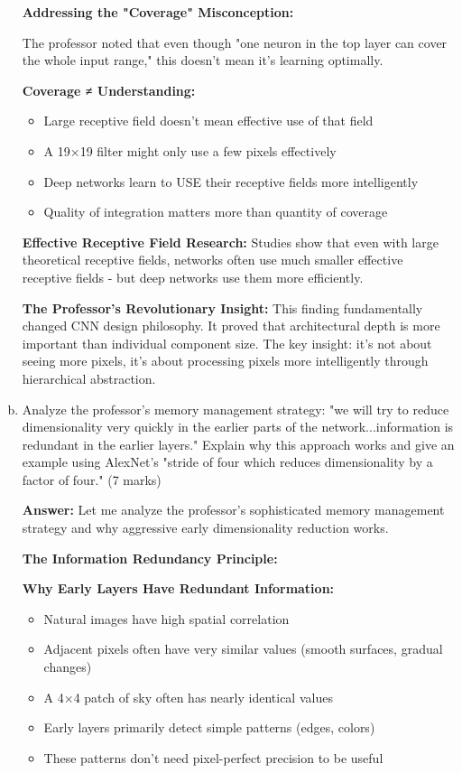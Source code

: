 \documentclass[12pt]{article}
\newcommand{\answer}[1]{{\color{answercolor}\textbf{Answer:} #1}}
\newcommand{\explanation}[1]{{\color{explanationcolor}#1}}
\begin{document}
\begin{enumerate}[(a)]
{    \textbf{Addressing the "Coverage" Misconception:}
    
    \explanation{
    The professor noted that even though "one neuron in the top layer can cover the whole input range," this doesn't mean it's learning optimally.
    
    \textbf{Coverage ≠ Understanding:}
    \begin{itemize}
        \item Large receptive field doesn't mean effective use of that field
        \item A 19×19 filter might only use a few pixels effectively
        \item Deep networks learn to USE their receptive fields more intelligently
        \item Quality of integration matters more than quantity of coverage
    \end{itemize}
    
    \textbf{Effective Receptive Field Research:}
    Studies show that even with large theoretical receptive fields, networks often use much smaller effective receptive fields - but deep networks use them more efficiently.
    }
    
    \textbf{The Professor's Revolutionary Insight:}
    \explanation{
    This finding fundamentally changed CNN design philosophy. It proved that architectural depth is more important than individual component size. The key insight: it's not about seeing more pixels, it's about processing pixels more intelligently through hierarchical abstraction.
    }
    }
    
    \item Analyze the professor's memory management strategy: "we will try to reduce dimensionality very quickly in the earlier parts of the network...information is redundant in the earlier layers." Explain why this approach works and give an example using AlexNet's "stride of four which reduces dimensionality by a factor of four." \hfill (7 marks)
    
    \answer{
    Let me analyze the professor's sophisticated memory management strategy and why aggressive early dimensionality reduction works.
    
    \textbf{The Information Redundancy Principle:}
    
    \explanation{
    \textbf{Why Early Layers Have Redundant Information:}
    \begin{itemize}
        \item Natural images have high spatial correlation
        \item Adjacent pixels often have very similar values (smooth surfaces, gradual changes)
        \item A 4×4 patch of sky often has nearly identical values
        \item Early layers primarily detect simple patterns (edges, colors)
        \item These patterns don't need pixel-perfect precision to be useful
    \end{itemize}
    
}}
\end{enumerate}
\end{document}
